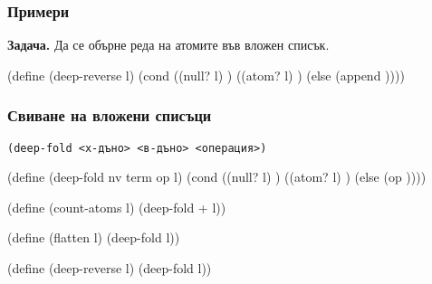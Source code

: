 \documentclass{beamer}
\begin{document}
\begin{frame}[fragile]
  \frametitle{Примери}

  \textbf{Задача.} Да се обърне реда на атомите във вложен списък.

  \pause

\begin{semiverbatim}
(define (deep-reverse l)
  (cond ((null? l) )
        ((atom? l) )
        (else (append 
                ))))
\end{semiverbatim}
\end{frame}

\begin{frame}[fragile]
  \frametitle{Свиване на вложени списъци}

  \tt{(deep-fold }<х-дъно> <в-дъно> <операция>\tt)

  \pause
  \onslide<+->

\begin{semiverbatim}
(define (deep-fold nv term op l)
  (cond ((null? l) )
        ((atom? l) )
        (else (op 
                  ))))
\end{semiverbatim}

  \onslide<+->
\begin{semiverbatim}
(define (count-atoms l) (deep-fold   \rvl+ l))
\end{semiverbatim}
  \onslide<+->
\begin{semiverbatim}
(define (flatten l) (deep-fold    l))
\end{semiverbatim}
  \onslide<+->
\begin{semiverbatim}

(define (deep-reverse l) (deep-fold    l))
\end{semiverbatim}
\end{frame}
\end{document}
